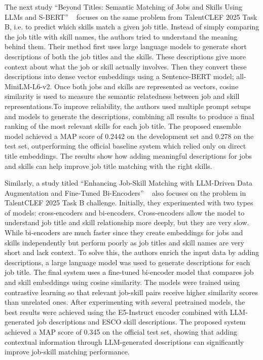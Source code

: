 \documentclass[]{ceurart}
\begin{document}
The next study “Beyond Titles: Semantic Matching of Jobs and Skills Using LLMs and S-BERT” ~\cite{vazquez2025beyond}
focuses on the same problem from TalentCLEF 2025 Task B, i.e. to predict which skills match 
a given job title. Instead of simply comparing the job title with skill names, the authors 
tried to understand the meaning behind them. Their method first uses large language models 
to generate short descriptions of both the job titles and the skills. These descriptions 
give more context about what the job or skill actually involves. Then they convert these 
descriptions into dense vector embeddings using a Sentence-BERT model; all-MiniLM-L6-v2. 
Once both jobs and skills are represented as vectors, cosine similarity is used to measure 
the semantic relatedness between job and skill representations.To improve reliability, 
the authors used multiple prompt setups and models to generate the descriptions, 
combining all results to produce a final ranking of the most relevant skills for each 
job title. The proposed ensemble model achieved a MAP score of 0.2442 on the development 
set and 0.278 on the test set, outperforming the official baseline system which relied 
only on direct title embeddings. The results show how adding meaningful descriptions for 
jobs and skills can help improve job title matching with the right skills. 

Similarly, a study titled “Enhancing Job-Skill Matching with LLM-Driven Data Augmentation 
and Fine-Tuned Bi-Encoders” ~\cite{ali2025jobskill} also focuses on the problem in TalentCLEF 2025 Task B challenge. 
Initially, they experimented with two types of models: cross-encoders and bi-encoders. 
Cross-encoders allow the model to understand job title and skill relationship more deeply, 
but they are very slow. While bi-encoders are much faster since they create embeddings for 
jobs and skills independently but perform poorly as job titles and skill names are very short 
and lack context. To solve this, the authors enrich the input data by adding descriptions, a 
large language model was used to generate descriptions for each job title. The final system 
uses a fine-tuned bi-encoder model that compares job and skill embeddings using cosine 
similarity. The models were trained using contrastive learning so that relevant job-skill 
pairs receive higher similarity scores than unrelated ones. After experimenting with several 
pretrained models, the best results were achieved using the E5-Instruct encoder combined 
with LLM-generated job descriptions and ESCO skill descriptions. The proposed system achieved 
a MAP score of 0.345 on the official test set, showing that adding contextual information 
through LLM-generated descriptions can significantly improve job-skill matching performance. 
\end{document}

